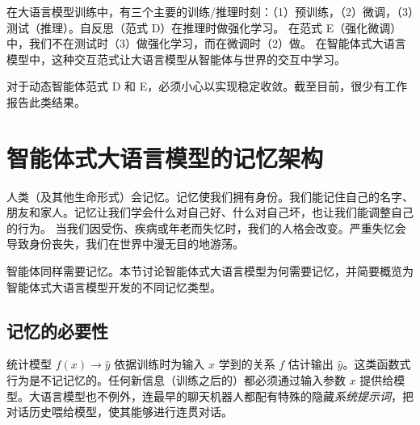 在大语言模型训练中，有三个主要的训练/推理时刻：（1）预训练，（2）微调，（3）测试（推理）。自反思（范式 D）在推理时做强化学习。
%
在范式 E（强化微调）中，我们不在测试时（3）做强化学习，而在微调时（2）做。%
%
%
在智能体式大语言模型中，这种交互范式让大语言模型从智能体与世界的交互中学习。

对于动态智能体范式 D 和 E，必须小心以实现稳定收敛。截至目前，很少有工作报告此类结果。

\section{智能体式大语言模型的记忆架构}\label{sec:memory}
人类（及其他生命形式）会记忆。记忆使我们拥有身份。我们能记住自己的名字、朋友和家人。记忆让我们学会什么对自己好、什么对自己坏，也让我们能调整自己的行为。
当我们因受伤、疾病或年老而失忆时，我们的人格会改变。严重失忆会导致身份丧失，我们在世界中漫无目的地游荡。

智能体同样需要记忆。本节讨论智能体式大语言模型为何需要记忆，并简要概览为智能体式大语言模型开发的不同记忆类型。

\subsection{记忆的必要性}%
统计模型 $f(x) \rightarrow \hat{y}$ 依据训练时为输入 $x$ 学到的关系 $f$ 估计输出 $\hat{y}$。这类函数式行为是不记记忆的。任何新信息（训练之后的）都必须通过输入参数 $x$ 提供给模型。大语言模型也不例外，连最早的聊天机器人都配有特殊的隐藏{\em 系统提示词}，把对话历史喂给模型，使其能够进行连贯对话。

